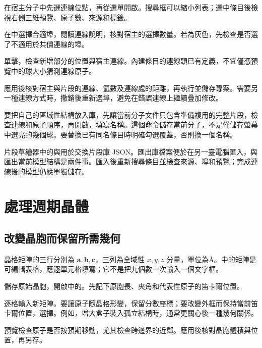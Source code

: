 \begin{steps}
  \item 在宿主分子中先選連線位點，再從選單開啟。搜尋框可以縮小列表；選中條目後檢視右側三維預覽、原子數、來源和標籤。
  \item 在中選擇合適埠，閱讀連線說明，核對宿主的選擇數量。若為灰色，先檢查是否選了不適用於共價連線的埠。
  \item 單擊，檢查新增部分的位置與宿主連線。內建條目的連線頭已有定義，不宜僅憑預覽中的球大小猜測連線原子。
  \item 應用後核對宿主與片段的連線、氫數及連線處的距離，再執行並儲存專案。需要另一種連線方式時，撤銷後重新選埠，避免在錯誤連線上繼續疊加修改。
\end{steps}

要把自己的區域性結構放入庫，先讓當前分子文件只包含準備複用的完整片段，檢查連線和原子順序，再開啟，填寫名稱。這個命令儲存當前分子，不是僅儲存螢幕中選亮的幾個球。要替換已有同名條目時明確勾選覆蓋，否則換一個名稱。

片段草繪器中的與用於交換片段庫 JSON。匯出庫檔案便於在另一臺電腦匯入，與匯出當前模型結構是兩件事。匯入後重新搜尋條目並檢查來源、埠和預覽；完成連線後的模型仍應單獨儲存。

\section{處理週期晶體}

\subsection{改變晶胞而保留所需幾何}\label{sec:lattice-transform-reference}

晶格矩陣的三行分別為 $\mathbf a,\mathbf b,\mathbf c$，三列為全域性 $x,y,z$ 分量，單位為\AA。中的矩陣是可編輯表格，應逐單元格填寫；它不是把九個數一次輸入一個文字框。



\begin{steps}
  \item 儲存原始晶胞，開啟中的。先記下原胞長、夾角和代表性原子的笛卡爾位置。
  \item 逐格輸入新矩陣。要讓原子隨晶格形變，保留分數座標；要改變外框而保持當前笛卡爾位置，選擇。例如，增大盒子裝入孤立結構時，通常更關心後一種幾何關係。
  \item 預覽檢查原子是否按預期移動，尤其檢查跨邊界的近鄰。應用後核對晶胞體積與位置，再另存。
\end{steps}

